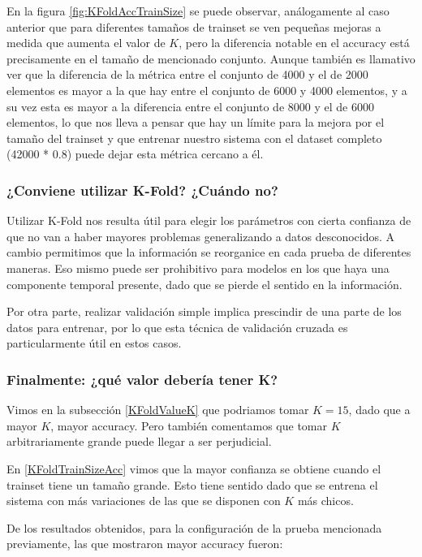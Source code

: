 En la figura \ref{fig:KFoldAccTrainSize} se puede observar, análogamente al caso anterior que para diferentes tamaños de trainset se ven pequeñas mejoras a medida que aumenta el valor de $K$, pero la diferencia notable en el accuracy está precisamente en el tamaño de mencionado conjunto. Aunque también es llamativo ver que la diferencia de la métrica entre el conjunto de 4000 y el de 2000 elementos es mayor a la que hay entre el conjunto de 6000 y 4000 elementos, y a su vez esta es mayor a la diferencia entre el conjunto de 8000 y el de 6000 elementos, lo que nos lleva a pensar que hay un límite para la mejora por el tamaño del trainset y que entrenar nuestro sistema con el dataset completo (42000 * 0.8) puede dejar esta métrica cercano a él.

\subsubsection{¿Conviene utilizar K-Fold? ¿Cuándo no?}

Utilizar K-Fold nos resulta útil para elegir los parámetros con cierta confianza de que no van a haber mayores problemas generalizando a datos desconocidos. A cambio permitimos que la información se reorganice en cada prueba de diferentes maneras. Eso mismo puede ser prohibitivo para modelos en los que haya una componente temporal presente, dado que se pierde el sentido en la información.

Por otra parte, realizar validación simple implica prescindir de una parte de los datos para entrenar, por lo que esta técnica de validación cruzada es particularmente útil en estos casos.

\subsubsection{Finalmente: ¿qué valor debería tener K?}

Vimos en la subsección \ref{KFoldValueK} que podriamos tomar $K=15$, dado que a mayor $K$, mayor accuracy. Pero también comentamos que tomar $K$ arbitrariamente grande puede llegar a ser perjudicial.

En \ref{KFoldTrainSizeAcc} vimos que la mayor confianza se obtiene cuando el trainset tiene un tamaño grande. Esto tiene sentido dado que se entrena el sistema con más variaciones de las que se disponen con $K$ más chicos.

De los resultados obtenidos, para la configuración de la prueba mencionada previamente, las que mostraron mayor accuracy fueron:


